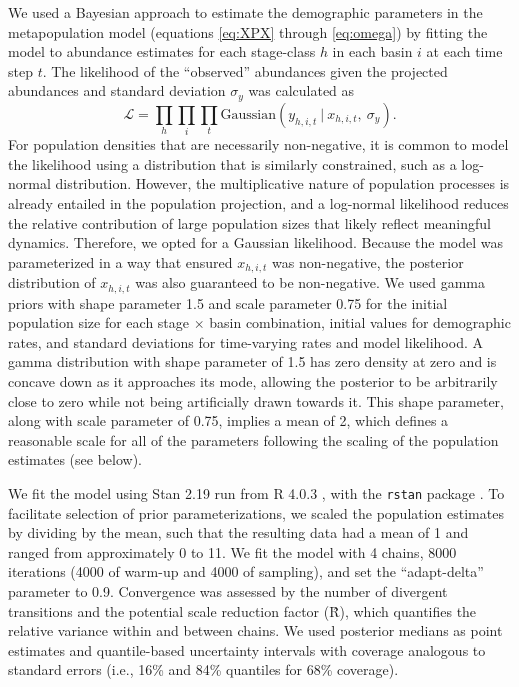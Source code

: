 \documentclass[11pt]{article}
\begin{document}
We used a Bayesian approach to estimate the demographic parameters in the metapopulation model
(equations \ref{eq:XPX} through \ref{eq:omega}) by fitting the model to
abundance estimates for each stage-class $h$ in each basin $i$ at each time step $t$.
The likelihood of the ``observed'' abundances given the projected abundances
and standard deviation $\sigma_y$ was calculated as
%
\begin{equation} \label{eq:likelihood}
\mathcal{L} =
\displaystyle\prod_{h}
\displaystyle\prod_{i}
\displaystyle\prod_{t}
\text{Gaussian}
    \left(
        y_{h,i,t}~|~x_{h,i,t},~\sigma_y
    \right).
\end{equation}
%
For population densities that are necessarily non-negative,
it is common to model the likelihood using a distribution that is similarly constrained,
such as a log-normal distribution.
However, the multiplicative nature of population processes is already entailed
in the population projection,
and a log-normal likelihood reduces the relative contribution of large population sizes
that likely reflect meaningful dynamics.
Therefore, we opted for a Gaussian likelihood.
Because the model was parameterized in a way that ensured
$x_{h,i,t}$ was non-negative,
the posterior distribution of $x_{h,i,t}$ was also guaranteed to be non-negative.
We used gamma priors with shape parameter 1.5 and scale parameter 0.75
for the initial population size for each stage $\times$ basin combination,
initial values for demographic rates,
and standard deviations for time-varying rates and model likelihood.
A gamma distribution with shape parameter of 1.5 has zero density at zero
and is concave down as it approaches its mode,
allowing the posterior to be arbitrarily close to zero
while not being artificially drawn towards it.
This shape parameter, along with scale parameter of 0.75,
implies a mean of 2,
which defines a reasonable scale for all of the parameters
following the scaling of the population estimates (see below).

We fit the model using Stan 2.19 \citep{carpenter2017}
run from R 4.0.3 \citep{r2020}, with the \texttt{rstan} package \citep{Stan2018}.
To facilitate selection of prior parameterizations,
we scaled the population estimates by dividing by the mean,
such that the resulting data had a mean of 1
and ranged from approximately 0 to 11.
We fit the model with 4 chains,
8000 iterations (4000 of warm-up and 4000 of sampling),
and set the ``adapt-delta'' parameter to 0.9.
Convergence was assessed by the number of divergent transitions
and the potential scale reduction factor (\^{R}),
which quantifies the relative variance within and between chains.
We used posterior medians as point estimates
and quantile-based uncertainty intervals
with coverage analogous to standard errors
(i.e., 16\% and 84\% quantiles for 68\% coverage).
\end{document}

